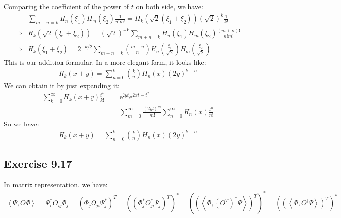 \documentclass[]{ctexart}
\newcommand{\me}{\mathrm{e}}
\begin{document}
		Comparing  the coefficient of the power of $t$ on both side, we have:
			\begin{equation*}
			\begin{aligned}
				&\sum_{m+n=k}H_n(\xi_1)H_m(\xi_2)\frac{1}{n!m!}=H_k(\sqrt{2}(\xi_1+\xi_2))(\sqrt{2})^k\frac{1}{k!}\\
				\Rightarrow &H_k(\sqrt{2}(\xi_1+\xi_2))=(\sqrt{2})^{-k}\sum_{m+n=k}H_n(\xi_1)H_m(\xi_2)\frac{(m+n)!}{n!m!}\\
				\Rightarrow &H_k(\xi_1+\xi_2)=2^{-k/2}\sum_{m+n=k}\binom{m+n}{n}H_n\left(\frac{\xi_1}{\sqrt{2}} \right) H_m\left(\frac{\xi_2}{\sqrt{2}} \right)
			\end{aligned}
			\end{equation*}
		This is our addition formular. In a more elegant form, it looks like:	
			\begin{equation*}
			\begin{aligned}
				H_{k}(x+y)=\sum_{n=0}^{k}\binom{k}{n} H_{n}(x)(2 y)^{k-n}
			\end{aligned}
			\end{equation*}	
		We can obtain it by just expanding it:
			\begin{equation*}
			\begin{aligned}
				\sum_{k=0}^{\infty} H_{k}(x+y) \frac{t^{k}}{k !} &=\me^{2 y t} \me^{2 x t-t^{2}} \\
				&=\sum_{m=0}^{\infty} \frac{(2 y t)^{m}}{m !} \sum_{n=0}^{\infty} H_{n}(x) \frac{t^{n}}{n !}
			\end{aligned}
			\end{equation*}
		So we have:
			\begin{equation*}
			\begin{aligned}
				H_{k}(x+y)=\sum_{n=0}^{k}\binom{k}{n} H_{n}(x)(2 y)^{k-n}
			\end{aligned}
			\end{equation*}	
	
	\subsection{Exercise 9.17}
		In matrix representation, we have:
			\begin{equation*}
			\begin{aligned}
			\left\langle \Psi,O \Phi \right\rangle  =\Psi_i^* O_{ij} \Phi_j= \left(\Phi_j O_{ji} \Psi_j^*\right)^T= \left( \left(\Phi_j^* O_{ji}^* \Psi_j\right)^T\right) ^*=\left( \left(\left\langle \Phi,(O^T)^* \Psi \right\rangle \right)^T\right) ^*=\left( \left(\left\langle \Phi,O^{\dagger} \Psi \right\rangle \right)^T\right) ^*
			\end{aligned}
			\end{equation*}
			
\end{document}

